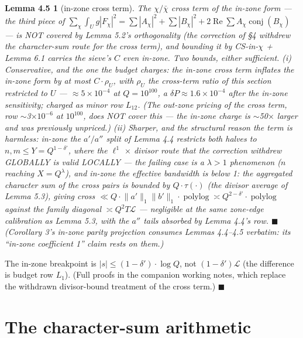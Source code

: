 \documentclass[11pt]{amsart}
\newcommand{\re}{\operatorname{Re}}
\newcommand{\conj}{\operatorname{conj}}
\theoremstyle{plain}
\newtheorem*{lemmafourfive}{Lemma 4.5}
\theoremstyle{remark}
\begin{document}
\begin{lemmafourfive}[in-zone cross term]
The $\chi/\bar{\chi}$ cross term of the in-zone form --- the third piece of
$\sum_\chi \int_U g|F_\chi|^2 = \sum|A_\chi|^2 + \sum|B_\chi|^2 +
2\re \sum A_\chi \conj(B_\chi)$ --- is NOT covered by Lemma 5.2's orthogonality (the
correction of \S4 withdrew the character-sum route for the cross term), and bounding
it by CS-in-$\chi$ + Lemma 6.1 carries the sieve's $C$ even in-zone. Two bounds,
either sufficient. (i) Conservative, and the one the budget charges: the in-zone
cross term inflates the in-zone form by at most $C\cdot\rho_U$, with $\rho_U$ the
cross-term ratio of this section restricted to $U$ --- $\approx 5\times10^{-4}$ at
$Q = 10^{100}$, a $\delta P \approx 1.6\times10^{-4}$ after the in-zone sensitivity;
charged as minor row $L_{12}$. (The out-zone pricing of the cross term, row
$\sim$3$\times10^{-6}$ at $10^{100}$, does NOT cover this --- the in-zone charge is
$\sim$50$\times$ larger and was previously unpriced.) (ii) Sharper, and the
structural reason the term is harmless: in-zone the $a'/a''$ split of Lemma 4.4
restricts both halves to $n, m \le Y = Q^{1-\delta'}$, where the $\ell^1$ $\times$
divisor route that the correction withdrew GLOBALLY is valid LOCALLY --- the failing
case is a $\lambda > 1$ phenomenon ($n$ reaching $X = Q^\lambda$), and in-zone the
effective bandwidth is below 1: the aggregated character sum of the cross pairs is
bounded by $Q\cdot\tau(\cdot)$ (the divisor average of Lemma 5.3), giving cross
$\ll Q\cdot\lVert a'\rVert_1\lVert b'\rVert_1\cdot\operatorname{polylog} \asymp
Q^{2-\delta'}\cdot\operatorname{polylog}$ against the family diagonal
$\asymp Q^2T\mathcal{L}$ --- negligible at the same zone-edge calibration as Lemma
5.3, with the $a''$ tails absorbed by Lemma 4.4's row. $\blacksquare$ (Corollary 3's
in-zone parity projection consumes Lemmas 4.4--4.5 verbatim: its ``in-zone
coefficient 1'' claim rests on them.)
\end{lemmafourfive}

The in-zone breakpoint is $|s| \le (1 - \delta')\cdot\log Q$, not
$(1 - \delta')\mathcal{L}$ (the difference is budget row $L_1$). (Full proofs in the
companion working notes, which replace the withdrawn divisor-bound treatment of the
cross term.) $\blacksquare$

\section{The character-sum arithmetic}
\end{document}
